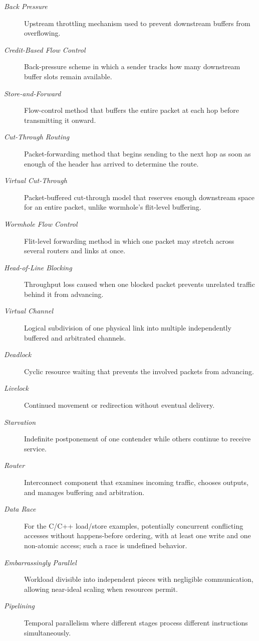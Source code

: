 \begin{description}
    \item[\textit{Back Pressure}] Upstream throttling mechanism used to prevent downstream buffers from overflowing.
    \item[\textit{Credit-Based Flow Control}] Back-pressure scheme in which a sender tracks how many downstream buffer slots remain available.
    \item[\textit{Store-and-Forward}] Flow-control method that buffers the entire packet at each hop before transmitting it onward.
    \item[\textit{Cut-Through Routing}] Packet-forwarding method that begins sending to the next hop as soon as enough of the header has arrived to determine the route.
    \item[\textit{Virtual Cut-Through}] Packet-buffered cut-through model that reserves enough downstream space for an entire packet, unlike wormhole's flit-level buffering.
    \item[\textit{Wormhole Flow Control}] Flit-level forwarding method in which one packet may stretch across several routers and links at once.
    \item[\textit{Head-of-Line Blocking}] Throughput loss caused when one blocked packet prevents unrelated traffic behind it from advancing.
    \item[\textit{Virtual Channel}] Logical subdivision of one physical link into multiple independently buffered and arbitrated channels.
    \item[\textit{Deadlock}] Cyclic resource waiting that prevents the involved packets from advancing.
    \item[\textit{Livelock}] Continued movement or redirection without eventual delivery.
    \item[\textit{Starvation}] Indefinite postponement of one contender while others continue to receive service.
    \item[\textit{Router}] Interconnect component that examines incoming traffic, chooses outputs, and manages buffering and arbitration.
    \item[\textit{Data Race}] For the C/C++ load/store examples, potentially concurrent conflicting accesses without happens-before ordering, with at least one write and one non-atomic access; such a race is undefined behavior.
    \item[\textit{Embarrassingly Parallel}] Workload divisible into independent pieces with negligible communication, allowing near-ideal scaling when resources permit.
    \item[\textit{Pipelining}] Temporal parallelism where different stages process different instructions simultaneously.

\end{description}
